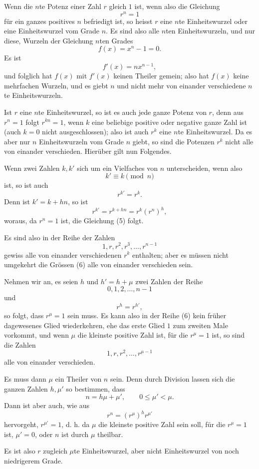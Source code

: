 \documentclass[11pt]{article}
\begin{document}
Wenn die $n$te Potenz einer Zahl $r$ gleich $1$ ist, wenn also die Gleichung
\[
\tag{1}        r^n=1
\]
für ein ganzes positives $n$ befriedigt ist, so heisst $r$ eine $n$te Einheitswurzel oder eine Einheitswurzel vom Grade $n$. Es sind also alle $n$ten Einheitswurzeln, und nur diese, Wurzeln der Gleichung $n$ten Grades
\[
\tag{2}        f(x)=x^n-1=0.
\]
Es ist
\[
\tag{3}        f'(x)=n x^{n-1},
\]
und folglich hat $f(x)$ mit $f'(x)$ keinen Theiler gemein; also hat $f(x)$ keine mehrfachen Wurzeln, und es giebt $n$ und nicht mehr von einander verschiedene $n$te Einheitswurzeln.

Ist $r$ eine $n$te Einheitswurzel, so ist es auch jede ganze Potenz von $r$, denn aus $r^n=1$ folgt $r^{kn}=1$, wenn $k$ eine beliebige positive oder negative ganze Zahl ist (auch $k=0$ nicht ausgeschlossen); also ist auch $r^k$ eine $n$te Einheitswurzel. Da es aber nur $n$ Einheitswurzeln vom Grade $n$ giebt, so sind die Potenzen $r^k$ nicht alle von einander verschieden. Hierüber gilt nun Folgendes.

Wenn zwei Zahlen $k,k'$ sich um ein Vielfaches von $n$ unterscheiden, wenn also
\[
\tag{4}        k'
\equiv k \pmod n
\]
ist, so ist auch
\[
\tag{5}        r^{k'}=r^k.
\]
Denn ist $k'=k+hn$, so ist
\[
        r^{k'}=r^{k+hn}=r^k(r^n)^h,
\]
woraus, da $r^n=1$ ist, die Gleichung (5) folgt.

Es sind also in der Reihe der Zahlen
\[
\tag{6}        1,r,r^2,r^3,\ldots,r^{n-1}
\]
gewiss alle von einander verschiedenen $r^k$ enthalten; aber es müssen nicht umgekehrt die Grössen (6) alle von einander verschieden sein.

Nehmen wir an, es seien $h$ und $h'=h+\mu$ zwei Zahlen der Reihe
\[
        0,1,2,\ldots,n-1
\]
und
\[
        r^h=r^{h'},
\]
so folgt, dass $r^\mu=1$ sein muss. Es kann also in der Reihe (6) kein früher dagewesenes Glied wiederkehren, ehe das erste Glied $1$ zum zweiten Male vorkommt, und wenn $\mu$ die kleinste positive Zahl ist, für die $r^\mu=1$ ist, so sind die Zahlen
\[
\tag{7}        1,r,r^2,\ldots,r^{\mu-1}
\]
alle von einander verschieden.

Es muss dann $\mu$ ein Theiler von $n$ sein. Denn durch Division lassen sich die ganzen Zahlen $h,\mu'$ so bestimmen, dass
\[
        n=h\mu+\mu',\qquad 0\le \mu'<\mu.
\]
Dann ist aber auch, wie aus
\[
        r^n=(r^\mu)^h r^{\mu'}
\]
hervorgeht, $r^{\mu'}=1$, d. h. da $\mu$ die kleinste positive Zahl sein soll, für die $r^\mu=1$ ist, $\mu'=0$, oder $n$ ist durch $\mu$ theilbar.

Es ist also $r$ zugleich $\mu$te Einheitswurzel, aber nicht Einheitswurzel von noch niedrigerem Grade.
\end{document}
